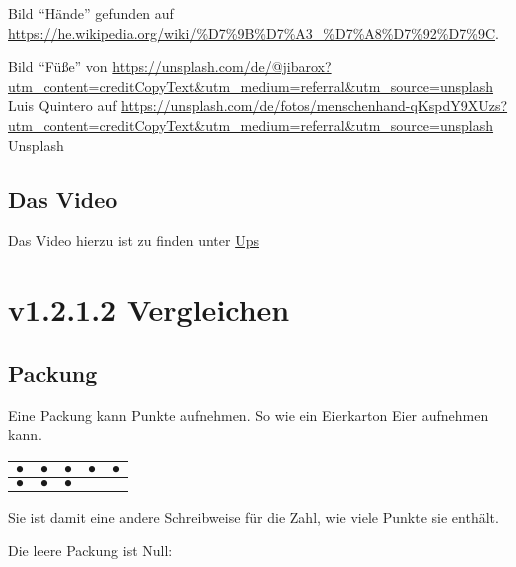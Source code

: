 \documentclass[a4paper]{amsart}
\theoremstyle{definition}
\begin{document}
Bild "`Hände"' gefunden auf \url{https://he.wikipedia.org/wiki/%D7%9B%D7%A3_%D7%A8%D7%92%D7%9C}.

Bild "`Füße"' von \url{https://unsplash.com/de/@jibarox?utm_content=creditCopyText\&utm_medium=referral\&utm_source=unsplash} Luis Quintero auf \url{https://unsplash.com/de/fotos/menschenhand-qKspdY9XUzs?utm\_content=creditCopyText\&utm_medium=referral\&utm\_source=unsplash} Unsplash

\subsection*{Das Video}
Das Video hierzu ist zu finden unter \url{Ups}

\section{v1.2.1.2 Vergleichen}

\subsection{Packung}
Eine Packung kann Punkte aufnehmen. So wie ein Eierkarton Eier aufnehmen kann. 

\begin{tabular}{|c|c|c|c|c|}
   \hline
   $\bullet$ & $\bullet$ & $\bullet$ & $\bullet$ & $\bullet$\\
   \hline
   $\bullet$ & $\bullet$ & $\bullet$ &  & \\
   \hline
\end{tabular}
Sie ist damit eine andere Schreibweise für die Zahl, wie viele Punkte sie enthält.

Die leere Packung ist Null:
\end{document}

